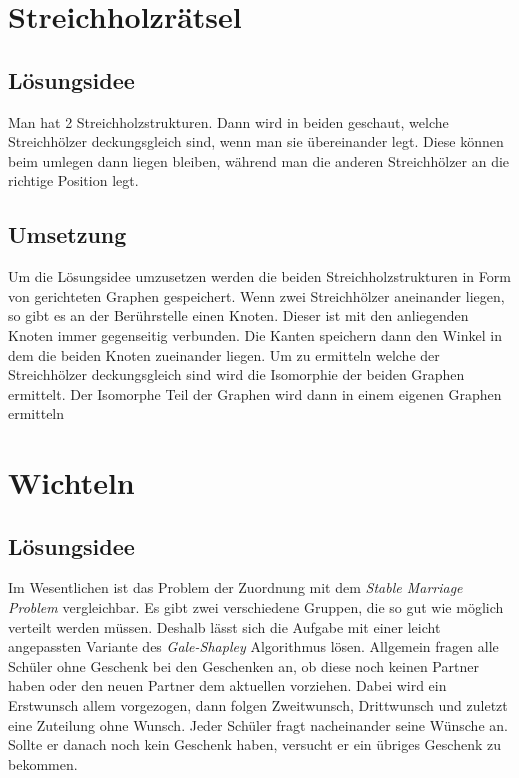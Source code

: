 \documentclass[a4paper, 12pt]{scrartcl}
\begin{document}
\section{Streichholzrätsel}
\subsection{Lösungsidee}

Man hat 2 Streichholzstrukturen. Dann wird in beiden geschaut, welche Streichhölzer deckungsgleich sind, wenn man sie übereinander legt. Diese können beim umlegen dann liegen bleiben, während man die anderen Streichhölzer an die richtige Position legt.

\subsection{Umsetzung}

Um die Lösungsidee umzusetzen werden die beiden Streichholzstrukturen in Form von gerichteten Graphen gespeichert. Wenn zwei Streichhölzer aneinander liegen, so gibt es an der Berührstelle einen Knoten. Dieser ist mit den anliegenden Knoten immer gegenseitig verbunden. Die Kanten speichern dann den Winkel in dem die beiden Knoten zueinander liegen. Um zu ermitteln welche der Streichhölzer deckungsgleich sind wird die Isomorphie der beiden Graphen ermittelt. Der Isomorphe Teil der Graphen wird dann in einem eigenen Graphen ermitteln

\section{Wichteln}
\subsection{Lösungsidee}

Im Wesentlichen ist das Problem der Zuordnung mit dem \emph{Stable Marriage Problem} vergleichbar. Es gibt zwei verschiedene Gruppen, die so gut wie möglich verteilt werden müssen. Deshalb lässt sich die Aufgabe mit einer leicht angepassten Variante des \emph{Gale-Shapley} Algorithmus lösen. Allgemein fragen alle Schüler ohne Geschenk bei den Geschenken an, ob diese noch keinen Partner haben oder den neuen Partner dem aktuellen vorziehen. Dabei wird ein Erstwunsch allem vorgezogen, dann folgen Zweitwunsch, Drittwunsch und zuletzt eine Zuteilung ohne Wunsch. Jeder Schüler fragt nacheinander seine Wünsche an. Sollte er danach noch kein Geschenk haben, versucht er ein übriges Geschenk zu bekommen.
\end{document}
